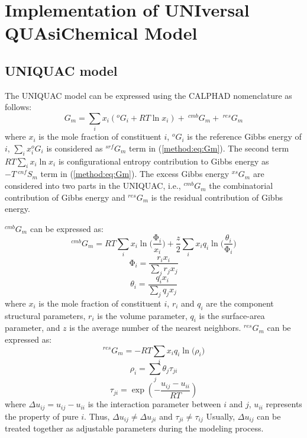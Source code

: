 \section{Implementation of UNIversal QUAsiChemical Model} \label{models:sec:UNIQUAC}
\subsection{UNIQUAC model} \label{models:ssec:UNIQUACfund}
The UNIQUAC model can be expressed using the CALPHAD nomenclature as follows:
\begin{equation} \label{models:eq:UQCGm}
    G_m=\sum_ix_i(^{o}G_i+RT\ln x_i) +\:^{cmb}G_m +\:^{res}G_m
\end{equation}
where $x_i$ is the mole fraction of constituent $i$, ${^o}G_i$ is the reference Gibbs energy of $i$, $\sum_ix_i^{o}G_i$ is considered as $^{srf}G_m$ term in (\ref{method:eq:Gm}). The second term $RT\sum_ix_i\ln x_i$ is configurational entropy contribution to Gibbs energy as $-T\:^{cnf}S_m$ term in (\ref{method:eq:Gm}). The excess Gibbs energy $^{xs}G_m$ are considered into two parts in the UNIQUAC, i.e., $^{cmb}G_m$ the combinatorial contribution of Gibbs energy and $^{res}G_m$ is the residual contribution of Gibbs energy.  

$^{cmb}G_m$ can be expressed as:
\begin{equation} \label{models:eq:UQCGcmb}
    ^{cmb}G_m=RT\sum_{i}{x_i\ln(\frac{\mathrm{\Phi}_i}{x_i}})+\frac{z}{2}\sum_{i}{x_iq_i\ln(\frac{\theta_i}{\mathrm{\Phi}_i}})
\end{equation}
\begin{equation} \label{models:eq:UQCphi}
    \mathrm{\Phi}_i=\frac{r_{i}x_i}{\sum_{j}{{r}_{j}x_j}}
\end{equation}
\begin{equation} \label{models:eq:UQCtheta}
    \theta_i= \frac{q_{i}x_i}{\sum_{j}{{q}_{j}x_j}}
\end{equation}
where $x_i$ is the mole fraction of constituent $i$, $r_i$ and $q_i$ are the component structural parameters, $r_i$ is the volume parameter, $q_i$ is the surface-area parameter, and $z$ is the average number of the nearest neighbors. $^{res}G_m$ can be expressed as:
\begin{equation} \label{models:eq:UQCres}
    {^{res}}G_m=-RT\sum_{i}{x_iq_i\ln(\rho_i})
\end{equation}
\begin{equation} \label{models:eq:rho}
    \rho_i=\sum_{j}{\theta_j\tau_{ji}}
\end{equation}
\begin{equation} \label{models:eq:UQCtau}
    \tau_{ji}=\exp \left(-\frac{u_{ij}-u_{ii}}{RT}\right)
\end{equation}
where $\Delta u_{ij}=u_{ij}-u_{ii}$ is the interaction parameter between $i$ and $j$, $u_{ii}$ represents the property of pure $i$. Thus, $\Delta u_{ij} \neq \Delta u_{ji}$ and $\tau_{ji} \neq \tau_{ij}$ Usually, $\Delta u_{ij}$ can be treated together as adjustable parameters during the modeling process.

